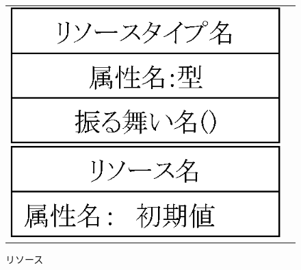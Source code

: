 \begin{figure}[h]
\begin{tabular}{cc}
\begin{minipage}{0.5\hsize}
\begin{center}
\includegraphics[scale=0.5]{img/resourceTypeSample.eps}
\caption{リソースタイプ}
\label{fig:resourceTypeSample}
\end{center}
\end{minipage}
\begin{minipage}{0.5\hsize}
\begin{center}
\includegraphics[scale=0.5]{img/resourceSample.eps}
\caption{リソース}
\label{fig:resourceSample}
\end{center}
\end{minipage}
\end{tabular}
\end{figure}

